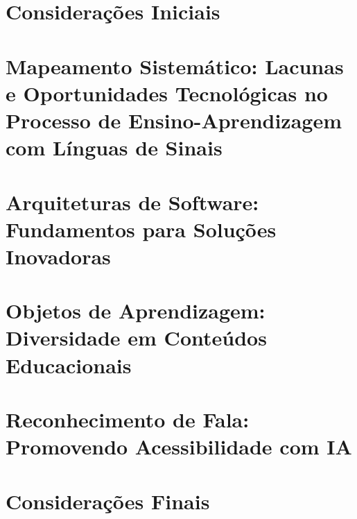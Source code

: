 \section{Considerações Iniciais}

\section{Mapeamento Sistemático: Lacunas e Oportunidades Tecnológicas no Processo de Ensino-Aprendizagem com Línguas de Sinais}

\section{Arquiteturas de Software: Fundamentos para Soluções Inovadoras}

\section{Objetos de Aprendizagem: Diversidade em Conteúdos Educacionais}

\section{Reconhecimento de Fala: Promovendo Acessibilidade com IA}

\section{Considerações Finais}
